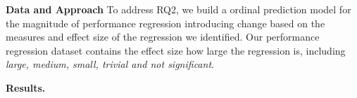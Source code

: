 


\noindent \textbf{Data and Approach}
To address RQ2, we build a ordinal prediction model for the magnitude of performance regression introducing change based on the measures and effect size of the regression we identified. Our performance regression dataset contains the effect size how large the regression is, including \emph{large, medium, small, trivial and not significant}.



\noindent \textbf{Results.}

